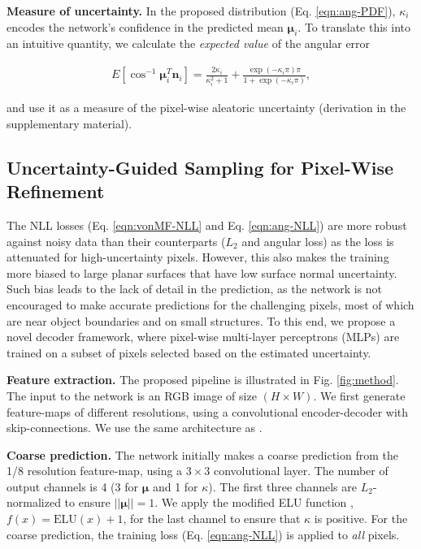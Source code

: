 \documentclass[10pt,twocolumn,letterpaper]{article}
\begin{document}
\noindent
\textbf{Measure of uncertainty.} In the proposed distribution (Eq. \ref{eqn:ang-PDF}), $\kappa_i$ encodes the network's confidence in the predicted mean $\boldsymbol{\mu}_i$. To translate this into an intuitive quantity, we calculate the \textit{expected value} of the angular error

\begin{align}
\label{eqn:ang-uncertainty}
E[\cos^{-1} \boldsymbol{\mu}_i^T \mathbf{n}_i] 
= \frac{2\kappa_i}{\kappa_i^2+1}
+ \frac{\exp(-\kappa_i \pi)\pi}{1 + \exp(-\kappa_i \pi)},
\end{align}

\noindent
and use it as a measure of the pixel-wise aleatoric uncertainty (derivation in the supplementary material).

\subsection{Uncertainty-Guided Sampling for Pixel-Wise Refinement}
\label{sec:method2}

The NLL losses (Eq. \ref{eqn:vonMF-NLL} and Eq. \ref{eqn:ang-NLL}) are more robust against noisy data than their counterparts ($L_2$ and angular loss) as the loss is attenuated for high-uncertainty pixels. However, this also makes the training more biased to large planar surfaces that have low surface normal uncertainty. Such bias leads to the lack of detail in the prediction, as the network is not encouraged to make accurate predictions for the challenging pixels, most of which are near object boundaries and on small structures. To this end, we propose a novel decoder framework, where pixel-wise multi-layer perceptrons (MLPs) are trained on a subset of pixels selected based on the estimated uncertainty.

\noindent
\textbf{Feature extraction.} The proposed pipeline is illustrated in Fig. \ref{fig:method}. The input to the network is an RGB image of size $(H \times W)$. We first generate feature-maps of different resolutions, using a convolutional encoder-decoder with skip-connections. We use the same architecture as \cite{adabins}.

\noindent
\textbf{Coarse prediction.} The network initially makes a coarse prediction from the 1/8 resolution feature-map, using a $3\times 3$ convolutional layer. The number of output channels is 4 (3 for $\boldsymbol{\mu}$ and 1 for $\kappa$). The first three channels are $L_2$-normalized to ensure $||\boldsymbol{\mu}||=1$. We apply the modified ELU function \cite{other-ELU}, $f(x)=\text{ELU}(x)+1$, for the last channel to ensure that $\kappa$ is positive. For the coarse prediction, the training loss (Eq. \ref{eqn:ang-NLL}) is applied to \textit{all} pixels.
\end{document}
